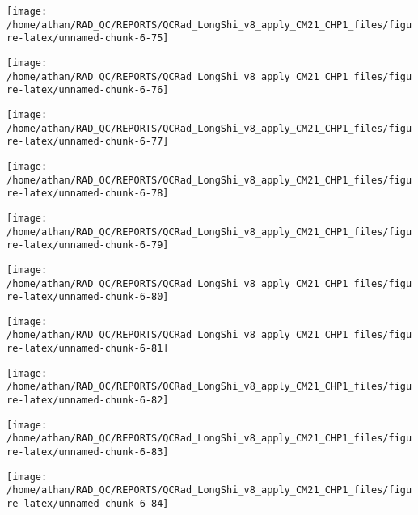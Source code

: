 \documentclass[
  10pt,
  a4paper,oneside]{article}
\begin{document}
\begin{center}\texttt{[image: /home/athan/RAD\_QC/REPORTS/QCRad\_LongShi\_v8\_apply\_CM21\_CHP1\_files/figure-latex/unnamed-chunk-6-75]} \end{center}

\begin{center}\texttt{[image: /home/athan/RAD\_QC/REPORTS/QCRad\_LongShi\_v8\_apply\_CM21\_CHP1\_files/figure-latex/unnamed-chunk-6-76]} \end{center}

\begin{center}\texttt{[image: /home/athan/RAD\_QC/REPORTS/QCRad\_LongShi\_v8\_apply\_CM21\_CHP1\_files/figure-latex/unnamed-chunk-6-77]} \end{center}

\begin{center}\texttt{[image: /home/athan/RAD\_QC/REPORTS/QCRad\_LongShi\_v8\_apply\_CM21\_CHP1\_files/figure-latex/unnamed-chunk-6-78]} \end{center}

\begin{center}\texttt{[image: /home/athan/RAD\_QC/REPORTS/QCRad\_LongShi\_v8\_apply\_CM21\_CHP1\_files/figure-latex/unnamed-chunk-6-79]} \end{center}

\begin{center}\texttt{[image: /home/athan/RAD\_QC/REPORTS/QCRad\_LongShi\_v8\_apply\_CM21\_CHP1\_files/figure-latex/unnamed-chunk-6-80]} \end{center}

\begin{center}\texttt{[image: /home/athan/RAD\_QC/REPORTS/QCRad\_LongShi\_v8\_apply\_CM21\_CHP1\_files/figure-latex/unnamed-chunk-6-81]} \end{center}

\begin{center}\texttt{[image: /home/athan/RAD\_QC/REPORTS/QCRad\_LongShi\_v8\_apply\_CM21\_CHP1\_files/figure-latex/unnamed-chunk-6-82]} \end{center}

\begin{center}\texttt{[image: /home/athan/RAD\_QC/REPORTS/QCRad\_LongShi\_v8\_apply\_CM21\_CHP1\_files/figure-latex/unnamed-chunk-6-83]} \end{center}

\begin{center}\texttt{[image: /home/athan/RAD\_QC/REPORTS/QCRad\_LongShi\_v8\_apply\_CM21\_CHP1\_files/figure-latex/unnamed-chunk-6-84]} \end{center}
\end{document}

